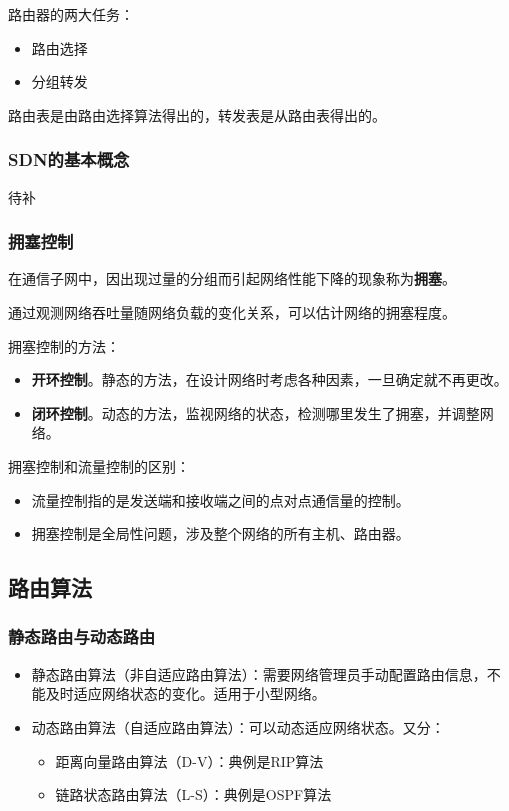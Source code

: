 \documentclass[12pt, a4paper, oneside]{ctexart}
\begin{document}
路由器的两大任务：
\begin{itemize}
    \item 路由选择
    \item 分组转发
\end{itemize}

路由表是由路由选择算法得出的，转发表是从路由表得出的。

\subsubsection{SDN的基本概念}

待补

\subsubsection{拥塞控制}

在通信子网中，因出现过量的分组而引起网络性能下降的现象称为\textbf{拥塞}。

通过观测网络吞吐量随网络负载的变化关系，可以估计网络的拥塞程度。

拥塞控制的方法：
\begin{itemize}
    \item {\bf 开环控制}。静态的方法，在设计网络时考虑各种因素，一旦确定就不再更改。
    \item {\bf 闭环控制}。动态的方法，监视网络的状态，检测哪里发生了拥塞，并调整网络。
\end{itemize}

拥塞控制和流量控制的区别：
\begin{itemize}
    \item 流量控制指的是发送端和接收端之间的点对点通信量的控制。
    \item 拥塞控制是全局性问题，涉及整个网络的所有主机、路由器。
\end{itemize}

\subsection{路由算法}

\subsubsection{静态路由与动态路由}

\begin{itemize}
    \item 静态路由算法（非自适应路由算法）：需要网络管理员手动配置路由信息，不能及时适应网络状态的变化。适用于小型网络。
    \item 动态路由算法（自适应路由算法）：可以动态适应网络状态。又分：
    \begin{itemize}
        \item 距离向量路由算法（D-V）：典例是RIP算法
        \item 链路状态路由算法（L-S）：典例是OSPF算法
    \end{itemize}
\end{itemize}
\end{document}
